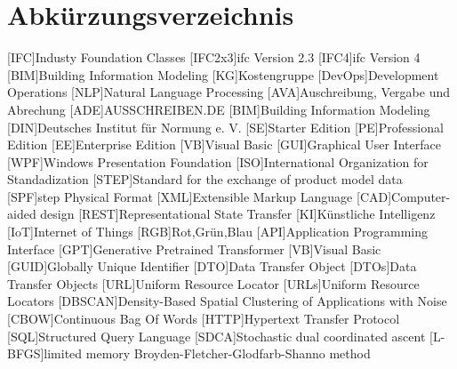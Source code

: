 \chapter{Abkürzungsverzeichnis}
\begin{acronym}
[IFC]{Industy Foundation Classes}
[IFC2x3]{\ac{ifc} Version 2.3}
[IFC4]{\ac{ifc} Version 4}
[BIM]{Building Information Modeling}
[KG]{Kostengruppe}
[DevOps]{Development Operations}
[NLP]{Natural Language Processing}
[AVA]{Auschreibung, Vergabe und Abrechung}
[ADE]{AUSSCHREIBEN.DE}
[BIM]{Building Information Modeling}
[DIN]{Deutsches Institut für Normung e. V.}
[SE]{Starter Edition}
[PE]{Professional Edition}
[EE]{Enterprise Edition}
[VB]{Visual Basic}
[GUI]{Graphical User Interface}
[WPF]{Windows Presentation Foundation}
[ISO]{International Organization for Standadization}
[STEP]{Standard for the exchange of product model data}
[SPF]{\ac{step} Physical Format}
[XML]{Extensible Markup Language}
[CAD]{Computer-aided design}
[REST]{Representational State Transfer}
[KI]{Künstliche Intelligenz}
[IoT]{Internet of Things}
[RGB]{Rot,Grün,Blau}
[API]{Application Programming Interface}
[GPT]{Generative Pretrained Transformer}
[VB]{Visual Basic}
[GUID]{Globally Unique Identifier}
[DTO]{Data Transfer Object}
[DTOs]{Data Transfer Objects}
[URL]{Uniform Resource Locator}
[URLs]{Uniform Resource Locators}
[DBSCAN]{Density-Based Spatial Clustering of Applications with Noise}
[CBOW]{Continuous Bag Of Words}
[HTTP]{Hypertext Transfer Protocol}
[SQL]{Structured Query Language}
[SDCA]{Stochastic dual coordinated ascent}
[L-BFGS]{limited memory Broyden-Fletcher-Glodfarb-Shanno method}
\end{acronym}